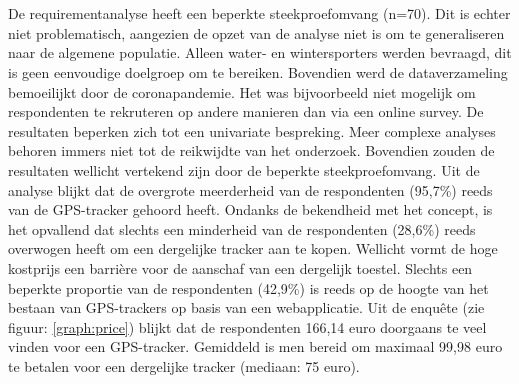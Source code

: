 \chapter{}
\label{ch:resultaten}
\section{}
De requirementanalyse heeft een beperkte steekproefomvang (n=70). Dit is echter niet problematisch, aangezien de opzet van de analyse niet is om te generaliseren naar de algemene populatie. Alleen water- en wintersporters werden bevraagd, dit is geen eenvoudige doelgroep om te bereiken. Bovendien werd de dataverzameling bemoeilijkt door de coronapandemie. Het was bijvoorbeeld niet mogelijk om respondenten te rekruteren op andere manieren dan via een online survey. De resultaten beperken zich tot een univariate bespreking. Meer complexe analyses behoren immers niet tot de reikwijdte van het onderzoek. Bovendien zouden de resultaten wellicht vertekend zijn door de beperkte steekproefomvang. Uit de analyse blijkt dat de overgrote meerderheid van de respondenten (95,7\%) reeds van de GPS-tracker gehoord heeft. Ondanks de bekendheid met het concept, is het opvallend dat slechts een minderheid van de respondenten (28,6\%) reeds overwogen heeft om een dergelijke tracker aan te kopen. Wellicht vormt de hoge kostprijs een barrière voor de aanschaf van een dergelijk toestel. Slechts een beperkte proportie van de respondenten (42,9\%) is reeds op de hoogte van het bestaan van GPS-trackers op basis van een webapplicatie. Uit de enquête (zie figuur: \ref{graph:price}) blijkt dat de respondenten 166,14 euro doorgaans te veel vinden voor een GPS-tracker. Gemiddeld is men bereid om maximaal 99,98 euro te betalen voor een dergelijke tracker (mediaan: 75 euro).



